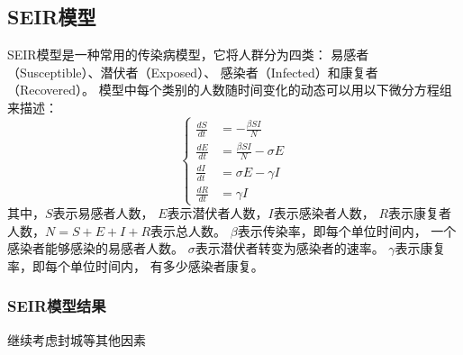 \documentclass{article}
\begin{document}
\subsection*{SEIR模型}
SEIR模型是一种常用的传染病模型，它将人群分为四类：
易感者（Susceptible）、潜伏者（Exposed）、
感染者（Infected）和康复者（Recovered）。
模型中每个类别的人数随时间变化的动态可以用以下微分方程组来描述：
$$\begin{cases}
    \frac{d S}{d t} & =-\frac{\beta S I}{N} \\
\frac{d E}{d t} & =\frac{\beta S I}{N}-\sigma E \\
\frac{d I}{d t} & =\sigma E-\gamma I \\
\frac{d R}{d t} & =\gamma I
\end{cases}$$
其中，$S$表示易感者人数，
$E$表示潜伏者人数，$I$表示感染者人数，
$R$表示康复者人数，$N=S+E+I+R$表示总人数。
$\beta$表示传染率，即每个单位时间内，
一个感染者能够感染的易感者人数。
$\sigma$表示潜伏者转变为感染者的速率。
$\gamma$表示康复率，即每个单位时间内，
有多少感染者康复。
\clearpage
\subsubsection*{SEIR模型结果}

\begin{figure}[h!]
    \centering
        
\end{figure}

继续考虑封城等其他因素
\end{document}
